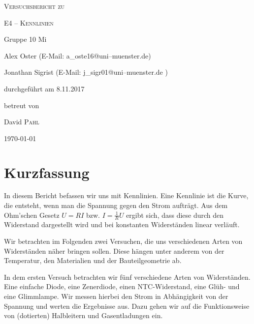 \documentclass[11pt,a4paper,titlepage, ngerman]{article}
\begin{document}
	
	\begin{titlepage}
		\centering
		{\scshape\LARGE Versuchsbericht zu \par}
		\vspace{1cm}
		{\scshape\huge E4 -- Kennlinien\par}
		\vspace{2.5cm}
		{\LARGE Gruppe 10 Mi\par}
		\vspace{0.5cm}
		{\large Alex Oster (E-Mail: a\_oste16@uni--muenster.de) \par}
		{\large Jonathan Sigrist (E-Mail: j\_sigr01@uni--muenster.de ) \par}
		\vfill
		durchgeführt am 8.11.2017\par
		betreut von\par
		{\large David \textsc{Pahl}}
		
		\vfill
		
		
		{\large \today\par}
	\end{titlepage}
		
	\tableofcontents
	
	\newpage
	
	\section{Kurzfassung}
		
		In diesem Bericht befassen wir uns mit Kennlinien. Eine Kennlinie ist die Kurve, die entsteht, wenn man die Spannung gegen den Strom aufträgt. Aus dem Ohm'schen Gesetz $U=RI$ bzw. $I = \frac{1}{R}U $ ergibt sich, dass diese durch den Widerstand dargestellt wird und bei konstanten Widerständen linear verläuft.
		
		Wir betrachten im Folgenden zwei Versuchen, die uns verschiedenen Arten von Widerständen näher bringen sollen.
		Diese hängen unter anderem von der Temperatur, den Materialien und der Bauteilgeometrie ab.
		
		In dem ersten Versuch betrachten wir fünf verschiedene Arten von Widerständen. Eine einfache Diode, eine Zenerdiode, einen NTC-Widerstand, eine Glüh- und eine Glimmlampe. Wir messen hierbei den Strom in Abhängigkeit von der Spannung und werten die Ergebnisse aus. Dazu gehen wir auf die Funktionsweise von (dotierten) Halbleitern und Gasentladungen ein. 
		
\end{document}
